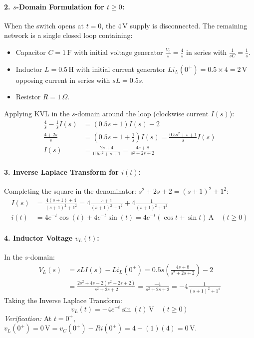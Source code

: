 \documentclass[11pt,a4paper,oneside]{article}
\begin{document}
\paragraph{2. $s$-Domain Formulation for $t \ge 0$:}
When the switch opens at $t=0$, the $4\,\mathrm{V}$ supply is disconnected. The remaining network is a single closed loop containing:
\begin{itemize}[leftmargin=1.5em]
  \item Capacitor $C = 1\,\mathrm{F}$ with initial voltage generator $\frac{V_0}{s} = \frac{4}{s}$ in series with $\frac{1}{sC} = \frac{1}{s}$.
  \item Inductor $L = 0.5\,\mathrm{H}$ with initial current generator $L i_L(0^+) = 0.5 \times 4 = 2\,\mathrm{V}$ opposing current in series with $sL = 0.5s$.
  \item Resistor $R = 1\,\Omega$.
\end{itemize}

Applying KVL in the $s$-domain around the loop (clockwise current $I(s)$):
\begin{align}
  \frac{4}{s} - \frac{1}{s} I(s) &= (0.5s + 1) I(s) - 2 \nonumber \\
  \frac{4 + 2s}{s} &= \left(0.5s + 1 + \frac{1}{s}\right) I(s) = \frac{0.5s^2 + s + 1}{s} I(s) \nonumber \\
  I(s) &= \frac{2s + 4}{0.5s^2 + s + 1} = \frac{4s + 8}{s^2 + 2s + 2}
\end{align}

\paragraph{3. Inverse Laplace Transform for $i(t)$:}
Completing the square in the denominator: $s^2 + 2s + 2 = (s+1)^2 + 1^2$:
\begin{align}
  I(s) &= \frac{4(s + 1) + 4}{(s + 1)^2 + 1^2} = 4 \frac{s + 1}{(s + 1)^2 + 1^2} + 4 \frac{1}{(s + 1)^2 + 1^2} \nonumber \\
  i(t) &= 4 e^{-t} \cos(t) + 4 e^{-t} \sin(t) = 4 e^{-t}(\cos t + \sin t)\,\mathrm{A} \quad (t \ge 0)
\end{align}

\paragraph{4. Inductor Voltage $v_L(t)$:}
In the $s$-domain:
\begin{align}
  V_L(s) &= sL I(s) - L i_L(0^+) = 0.5s \left(\frac{4s + 8}{s^2 + 2s + 2}\right) - 2 \nonumber \\
  &= \frac{2s^2 + 4s - 2(s^2 + 2s + 2)}{s^2 + 2s + 2} = \frac{-4}{s^2 + 2s + 2} = -4 \frac{1}{(s+1)^2 + 1^2}
\end{align}
Taking the Inverse Laplace Transform:
\begin{equation}
  v_L(t) = -4 e^{-t} \sin(t)\,\mathrm{V} \quad (t \ge 0)
\end{equation}
\textit{Verification:} At $t = 0^+$, $v_L(0^+) = 0\,\mathrm{V} = v_C(0^+) - R i(0^+) = 4 - (1)(4) = 0\,\mathrm{V}$.
\end{document}
